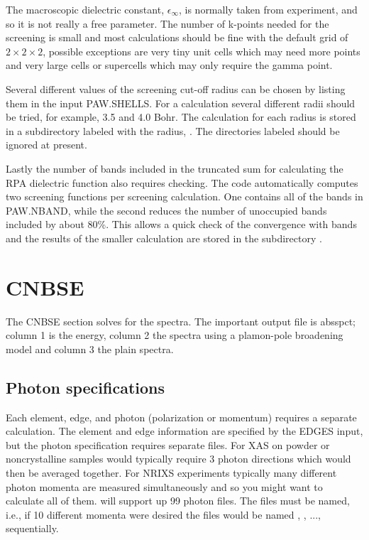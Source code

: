 \documentclass[11pt]{report}
\begin{document}
The macroscopic dielectric constant, $\epsilon_\infty$, is normally taken from experiment, and so it is not really a free parameter. The number of k-points needed for the screening is small and most calculations should be fine with the default grid of $2\times2\times2$, possible exceptions are very tiny unit cells which may need more points and very large cells or supercells which may only require the gamma point. 

Several different values of the screening cut-off radius can be chosen by listing them in the input PAW.SHELLS. For a calculation several different radii should be tried, for example, 3.5 and 4.0 Bohr. The calculation for each radius is stored in a subdirectory labeled with the radius, . The directories labeled  should be ignored at present. 

Lastly the number of bands included in the truncated sum for calculating the RPA dielectric function also requires checking. The code automatically computes two screening functions per screening calculation. One contains all of the bands in PAW.NBAND, while the second reduces the number of unoccupied bands included by about 80\%. This allows a quick check of the convergence with bands and the results of the smaller calculation are stored in the subdirectory .


\chapter{ CNBSE }
The CNBSE section solves for the spectra. The important output file is absspct; column 1 is the energy, 
column 2 the spectra using a plamon-pole broadening model and column 3 the plain spectra.

\iffalse
\section{Photon specifications}

Each element, edge, and photon (polarization or momentum) requires a separate calculation. 
The element and edge information are specified by the EDGES input, but the photon specification requires separate files. For XAS on 
powder or noncrystalline samples would typically require 3 photon directions which would then be averaged together. For NRIXS 
experiments typically many different photon momenta are measured simultaneously and so you might want to calculate all of them. 
 will support up 99 photon files. The files must be named, i.e., if 10 different momenta were desired the files would be named 
, , ...,  sequentially. 
\end{document}
